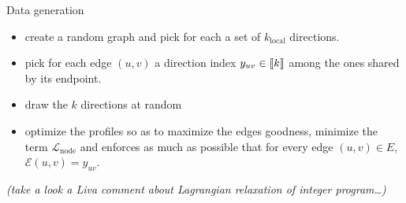 \documentclass[10pt,svgnames,ignorenonframetext,final]{beamer}
\begin{document}
\begin{frame}{Data generation}
\protect\hypertarget{data-generation}{}

\begin{itemize}
\item
  create a random graph and pick for each a set of \(k_\mathrm{local}\)
  directions.
\item
  pick for each edge \((u,v)\) a direction index \(y_{uv} \in \llbracket k \rrbracket\)
  among the ones shared by its endpoint.
\item
  draw the \(k\) directions at random
\item
  optimize the profiles so as to maximize the edges goodness, minimize
  the term \(\mathcal{L}_{\mathrm{node}}\) and enforces as much as
  possible that for every edge \((u,v) \in E\),
  \(\mathcal{E}(u,v) = y_{uv}\).
\end{itemize}

\emph{(take a look a Liva comment about Lagrangian relaxation of integer
program\ldots{})}

\end{frame}
\end{document}
